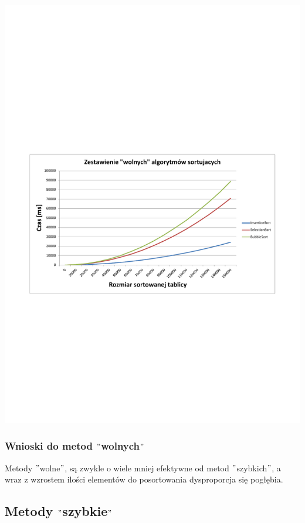 \documentclass[polish,polish,a4paper]{article}
\begin{document}
\begin{spacing}{1.5}
	\begin{minipage}[H]{\textwidth}
		\begin{center}
					\includegraphics[scale=0.85]{zad2wolne.pdf}
					\label{fig:zad2wolne}
		\end{center}
	\end{minipage}

\subsubsection{Wnioski do metod $"$wolnych$"$}

Metody $"$wolne$"$, są zwykle o wiele mniej efektywne od metod $"$szybkich$"$, a wraz z wzrostem ilości elementów do posortowania dysproporcja się pogłębia.
	
	\subsection{Metody $"$szybkie$"$}


\end{spacing}
\end{document}
